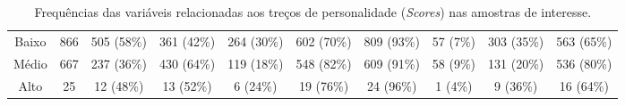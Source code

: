 \begin{landscape}
\begin{table}[h!]
\begin{tabular}{cccccccccc}
Baixo & 866 & 505 (58\%) & 361 (42\%) & 264 (30\%) & 602 (70\%) & 809 (93\%) & 57 (7\%) & 303 (35\%) & 563 (65\%) \\
Médio & 667 & 237 (36\%) & 430 (64\%) & 119 (18\%) & 548 (82\%) & 609 (91\%) & 58 (9\%) & 131 (20\%) & 536 (80\%) \\
Alto & 25 & 12 (48\%) & 13 (52\%) & 6 (24\%) & 19 (76\%) & 24 (96\%) & 1 (4\%) & 9 (36\%) & 16 (64\%) \\ \hline
\end{tabular}
\caption{Frequências das variáveis relacionadas aos treços de personalidade (\emph{Scores}) nas amostras de interesse.}
\label{tabela_scores}
\end{table}
\end{landscape}
\pagestyle{plain}